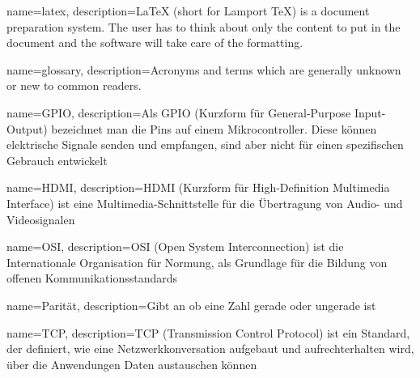 











{
	name=latex,
	description={LaTeX (short for Lamport TeX) is a document preparation system. The user has to think about only the content to put in the document and the software will take care of the formatting. }
}

{
	name=glossary,
	description={Acronyms and terms which are generally unknown or new to common readers.}
}

{
	name=GPIO,
	description={Als GPIO (Kurzform für General-Purpose Input-Output) bezeichnet man die Pins auf einem Mikrocontroller. Diese können elektrische Signale senden und empfangen, sind aber nicht für einen spezifischen Gebrauch entwickelt}
}

{
	name=HDMI,
	description={HDMI (Kurzform für High-Definition Multimedia Interface) ist eine Multimedia-Schnittstelle für die Übertragung von Audio- und Videosignalen}
}

{
	name=OSI,
	description={OSI (Open System Interconnection) ist die Internationale Organisation für Normung, als Grundlage für die Bildung von offenen Kommunikationsstandards}
}

{
	name=Parität,
	description={Gibt an ob eine Zahl gerade oder ungerade ist}
}

{
	name=TCP,
	description={TCP (Transmission Control Protocol) ist ein Standard, der definiert, wie eine Netzwerkkonversation aufgebaut und aufrechterhalten wird, über die Anwendungen Daten austauschen können}
}

